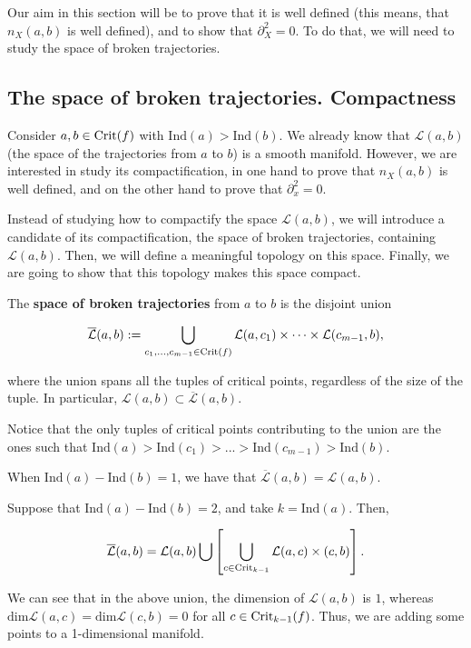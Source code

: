 Our aim in this section will be to prove that it is well defined (this means, that $n_X(a,b)$ is well defined), and to show that $\partial_X^2 = 0$. To do that, we will need to study the space of broken trajectories.

\subsection{The space of broken trajectories. Compactness}

Consider $a, b \in \text{Crit}(f)$ with $\text{Ind}(a) > \text{Ind}(b)$. We already know that $\mathcal{L}(a,b)$ (the space of the trajectories from $a$ to $b$) is a smooth manifold. However, we are interested in study its compactification, in one hand to prove that $n_X(a,b)$ is well defined, and on the other hand to prove that $\partial_x^2 = 0$.

Instead of studying how to compactify the space $\mathcal{L}(a,b)$, we will introduce a candidate of its compactification, the space of broken trajectories, containing $\mathcal{L}(a,b)$. Then, we will define a meaningful topology on this space. Finally, we are going to show that this topology makes this space compact.

\begin{deff}
The {\bf space of broken trajectories} from $a$ to $b$ is the disjoint union

$$\overline{\mathcal{L}}(a,b) := \bigcup_{c_1,...,c_{m-1} \in \text{Crit}(f)} \mathcal{L}(a,c_1) \times \cdots \times \mathcal{L}(c_{m-1},b) ,$$

where the union spans all the tuples of critical points, regardless of the size of the tuple. In particular, $\mathcal{L}(a,b) \subset \overline{\mathcal{L}}(a,b)$.

Notice that the only tuples of critical points contributing to the union are the ones such that $\text{Ind}(a) > \text{Ind}(c_1) > ... > \text{Ind}(c_{m-1}) > \text{Ind}(b)$.
\end{deff}

\begin{rmrk}
When $\text{Ind}(a) - \text{Ind}(b) = 1$, we have that $\overline{\mathcal{L}}(a,b) = \mathcal{L}(a,b)$.
\end{rmrk}

\begin{rmrk}
Suppose that $\text{Ind}(a) - \text{Ind}(b) = 2$, and take $k = \text{Ind}(a)$. Then,

$$\overline{\mathcal{L}}(a,b) = \mathcal{L}(a,b) \bigcup \left[ \bigcup_{c \in \text{Crit}_{k-1}} \mathcal{L}(a,c) \times \mathcal(c,b) \right] .$$

We can see that in the above union, the dimension of $\mathcal{L}(a,b)$ is $1$, whereas $\text{dim} \mathcal{L}(a,c) = \text{dim} \mathcal{L}(c,b) = 0$ for all $c \in \text{Crit}_{k-1}(f)$. Thus, we are adding some points to a 1-dimensional manifold.
\end{rmrk}

